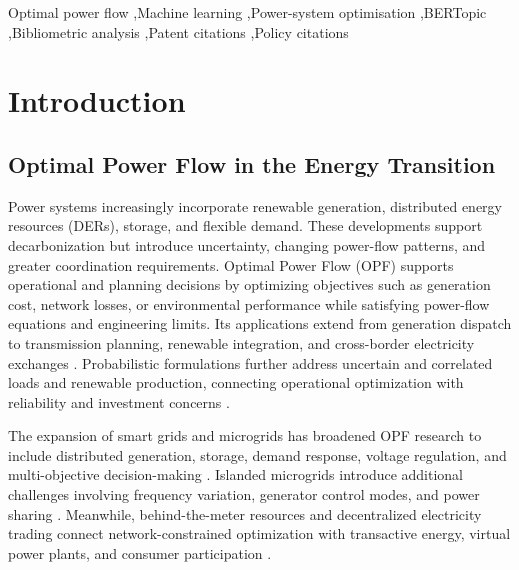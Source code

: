 \documentclass[a4paper,fleqn]{cas-sc}
\begin{document}


\begin{keywords}
Optimal power flow \sep Machine learning \sep Power-system optimisation \sep BERTopic \sep Bibliometric analysis \sep Patent citations \sep Policy citations
\end{keywords}

\maketitle
\section{Introduction}
\label{sec:introduction}

\subsection{Optimal Power Flow in the Energy Transition}

Power systems increasingly incorporate renewable generation, distributed energy resources (DERs), storage, and flexible demand. These developments support decarbonization but introduce uncertainty, changing power-flow patterns, and greater coordination requirements. Optimal Power Flow (OPF) supports operational and planning decisions by optimizing objectives such as generation cost, network losses, or environmental performance while satisfying power-flow equations and engineering limits. Its applications extend from generation dispatch to transmission planning, renewable integration, and cross-border electricity exchanges \cite{singh2014optimal}. Probabilistic formulations further address uncertain and correlated loads and renewable production, connecting operational optimization with reliability and investment concerns \cite{aien2015probabilistic}.

The expansion of smart grids and microgrids has broadened OPF research to include distributed generation, storage, demand response, voltage regulation, and multi-objective decision-making \cite{abdi2017review}. Islanded microgrids introduce additional challenges involving frequency variation, generator control modes, and power sharing \cite{moradi2017power}. Meanwhile, behind-the-meter resources and decentralized electricity trading connect network-constrained optimization with transactive energy, virtual power plants, and consumer participation \cite{guerrero2020towards}.
\end{document}
